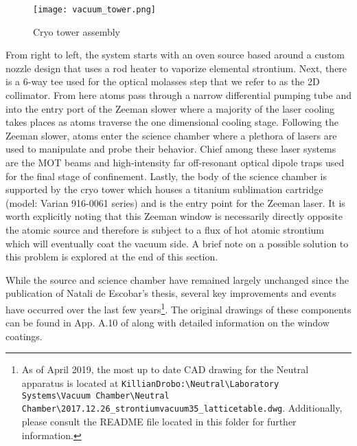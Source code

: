 	\begin{figure} 
		\centerline{
		\texttt{[image: vacuum\_tower.png]}}
		\caption{Cryo tower assembly}
		\label{fig:cryoTower}
	\end{figure}
From right to left, the system starts with an oven source based around a custom nozzle design that uses a rod heater to vaporize elemental strontium.
Next, there is a 6-way tee used for the optical molasses step that we refer to as the 2D collimator. 
From here atoms pass through a narrow differential pumping tube and into the entry port of the Zeeman slower where a majority of the laser cooling takes places as atoms traverse the one dimensional cooling stage. 
Following the Zeeman slower, atoms enter the science chamber where a plethora of lasers are used to manipulate and probe their behavior.
Chief among these laser systems are the MOT beams and high-intensity far off-resonant optical dipole traps used for the final stage of confinement.
Lastly, the body of the science chamber is supported by the cryo tower which houses a titanium sublimation cartridge (model: Varian 916-0061 series) and is the entry point for the Zeeman laser.
It is worth explicitly noting that this Zeeman window is necessarily directly opposite the atomic source and therefore is subject to a flux of hot atomic strontium which will eventually coat the vacuum side. A brief note on a possible solution to this problem is explored at the end of this section.

While the source and science chamber have remained largely unchanged since the publication of Natali de Escobar's thesis, several key improvements and events have occurred over the last few years\footnote{As of April 2019, the most up to date CAD drawing for the Neutral apparatus is located at \texttt{KillianDrobo:\textbackslash Neutral\textbackslash Laboratory Systems\textbackslash Vacuum Chamber\textbackslash Neutral Chamber\textbackslash 2017.12.26\_strontiumvacuum35\_latticetable.dwg}. Additionally, please consult the README file located in this folder for further information.}.
The original drawings of these components can be found in App. A.10 of \cite{MartinezdeEscolar2010} along with detailed information on the window coatings.





